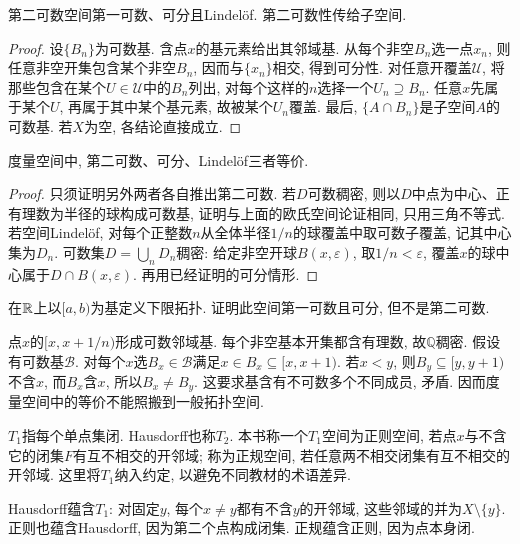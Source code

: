 \begin{proposition}\label{thm:second-countable}
第二可数空间第一可数、可分且Lindel\"of. 第二可数性传给子空间.
\end{proposition}
\begin{proof}
设$\{B_n\}$为可数基. 含点$x$的基元素给出其邻域基. 从每个非空$B_n$选一点$x_n$, 则任意非空开集包含某个非空$B_n$, 因而与$\{x_n\}$相交, 得到可分性. 对任意开覆盖$\mathcal U$, 将那些包含在某个$U\in\mathcal U$中的$B_n$列出, 对每个这样的$n$选择一个$U_n\supseteq B_n$. 任意$x$先属于某个$U$, 再属于其中某个基元素, 故被某个$U_n$覆盖. 最后, $\{A\cap B_n\}$是子空间$A$的可数基. 若$X$为空, 各结论直接成立.
\end{proof}

\begin{theorem}\label{thm:metric-countability}
度量空间中, 第二可数、可分、Lindel\"of三者等价.
\end{theorem}
\begin{proof}
只须证明另外两者各自推出第二可数. 若$D$可数稠密, 则以$D$中点为中心、正有理数为半径的球构成可数基, 证明与上面的欧氏空间论证相同, 只用三角不等式. 若空间Lindel\"of, 对每个正整数$n$从全体半径$1/n$的球覆盖中取可数子覆盖, 记其中心集为$D_n$. 可数集$D=\bigcup_nD_n$稠密: 给定非空开球$B(x,\varepsilon)$, 取$1/n<\varepsilon$, 覆盖$x$的球中心属于$D\cap B(x,\varepsilon)$. 再用已经证明的可分情形.
\end{proof}

\begin{example}
在$\mathbb R$上以$[a,b)$为基定义下限拓扑. 证明此空间第一可数且可分, 但不是第二可数.
\end{example}
\begin{solution}
点$x$的$[x,x+1/n)$形成可数邻域基. 每个非空基本开集都含有理数, 故$\mathbb Q$稠密. 假设有可数基$\mathcal B$. 对每个$x$选$B_x\in\mathcal B$满足$x\in B_x\subseteq[x,x+1)$. 若$x<y$, 则$B_y\subseteq[y,y+1)$不含$x$, 而$B_x$含$x$, 所以$B_x\ne B_y$. 这要求基含有不可数多个不同成员, 矛盾. 因而度量空间中的等价不能照搬到一般拓扑空间.
\end{solution}

\begin{definition}
$T_1$指每个单点集闭. Hausdorff也称$T_2$. 本书称一个$T_1$空间为正则空间, 若点$x$与不含它的闭集$F$有互不相交的开邻域; 称为正规空间, 若任意两不相交闭集有互不相交的开邻域. 这里将$T_1$纳入约定, 以避免不同教材的术语差异.
\end{definition}
Hausdorff蕴含$T_1$: 对固定$y$, 每个$x\ne y$都有不含$y$的开邻域, 这些邻域的并为$X\setminus\{y\}$. 正则也蕴含Hausdorff, 因为第二个点构成闭集. 正规蕴含正则, 因为点本身闭.


